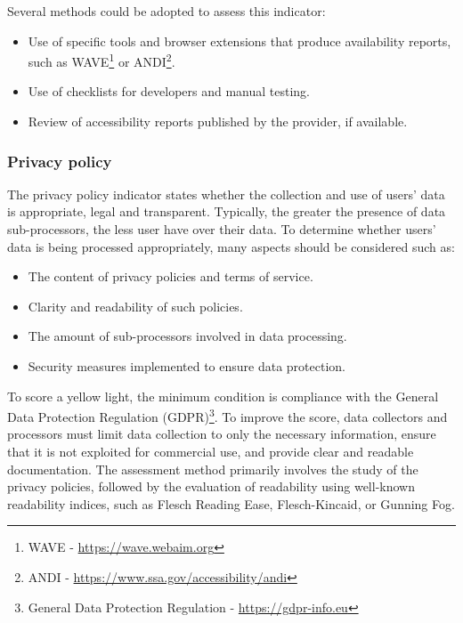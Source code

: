 Several methods could be adopted to assess this indicator:
\begin{itemize}[noitemsep, topsep=4pt, parsep=0pt, partopsep=0pt]
    \item Use of specific tools and browser extensions that produce availability reports, such as WAVE\footnote{WAVE - \href{https://wave.webaim.org/}{https://wave.webaim.org}} or ANDI\footnote{ANDI - \href{https://www.ssa.gov/accessibility/andi/help/install.html}{https://www.ssa.gov/accessibility/andi}}.
    \item Use of checklists for developers and manual testing.
    \item Review of accessibility reports published by the provider, if available.
\end{itemize}

\subsubsection{Privacy policy}
The privacy policy indicator states whether the collection and use of users' data is appropriate, legal and transparent. Typically, the greater the presence of data sub-processors, the less user have over their data.
To determine whether users' data is being processed appropriately, many aspects should be considered such as:
\begin{itemize}[noitemsep, topsep=4pt, parsep=0pt, partopsep=0pt]
    \item The content of privacy policies and terms of service.
    \item Clarity and readability of such policies.
    \item The amount of sub-processors involved in data processing.
    \item Security measures implemented to ensure data protection.
\end{itemize}
To score a yellow light, the minimum condition is compliance with the General Data Protection Regulation (GDPR)\footnote{General Data Protection Regulation - \href{https://gdpr-info.eu/}{https://gdpr-info.eu}}. To improve the score, data collectors and processors must limit data collection to only the necessary information, ensure that it is not exploited for commercial use, and provide clear and readable documentation. The assessment method primarily involves the study of the privacy policies, followed by the evaluation of readability using well-known readability indices, such as Flesch Reading Ease, Flesch-Kincaid, or Gunning Fog.     

